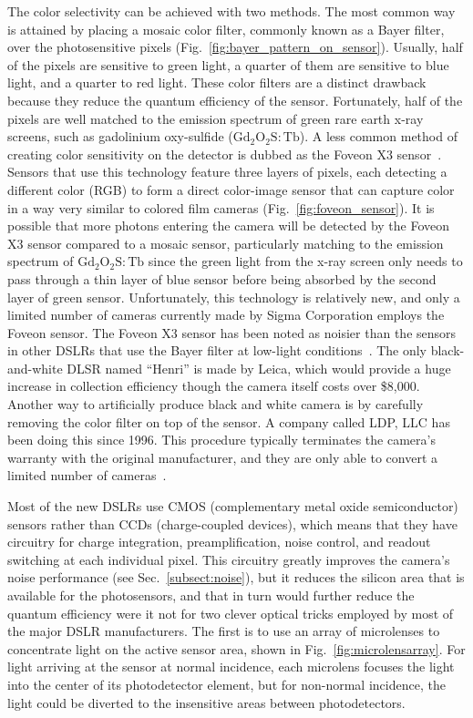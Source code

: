 The color selectivity can be achieved with two methods.  The most common way is attained by placing a mosaic color filter, commonly known as a Bayer filter, over the photosensitive pixels (Fig.~\ref{fig:bayer_pattern_on_sensor}).  Usually, half of the pixels are sensitive to green light, a quarter of them are sensitive to blue light, and a quarter to red light.  These color filters are a distinct drawback because they reduce the quantum efficiency of the sensor.  Fortunately, half of the pixels are well matched to the emission spectrum of green rare earth x-ray screens, such as gadolinium oxy-sulfide ($\mathrm{Gd_2O_2S:Tb}$).  A less common method of creating color sensitivity on the detector is dubbed as the Foveon X3 sensor~\citep{foveon}.  Sensors that use this technology feature three layers of pixels, each detecting a different color (RGB) to form a direct color-image sensor that can capture color in a way very similar to colored film cameras (Fig.~\ref{fig:foveon_sensor}).  It is possible that more photons entering the camera will be detected by the Foveon X3 sensor compared to a mosaic sensor, particularly matching to the emission spectrum of $\mathrm{Gd_2O_2S:Tb}$ since the green light from the x-ray screen only needs to pass through a thin layer of blue sensor before being absorbed by the second layer of green sensor.  Unfortunately, this technology is relatively new, and only a limited number of cameras currently made by Sigma Corporation employs the Foveon sensor.  The Foveon X3 sensor has been noted as noisier than the sensors in other DSLRs that use the Bayer filter at low-light conditions~\citep{sigmasd10, stevesdigicams}.  The only black-and-white DLSR named ``Henri'' is made by Leica, which would provide a huge increase in collection efficiency though the camera itself costs over \$8,000.  Another way to artificially produce black and white camera is by carefully removing the color filter on top of the sensor.  A company called LDP, LLC has been doing this since 1996.  This procedure typically terminates the camera's warranty with the original manufacturer, and they are only able to convert a limited number of cameras~\citep{maxmax}.

Most of the new DSLRs use CMOS (complementary metal oxide semiconductor) sensors rather than CCDs (charge-coupled devices), which means that they have circuitry for charge integration, preamplification, noise control, and readout switching at each individual pixel. This circuitry greatly improves the camera's noise performance (see Sec.~\ref{subsect:noise}), but it reduces the silicon area that is available for the photosensors, and that in turn would further reduce the quantum efficiency were it not for two clever optical tricks employed by most of the major DSLR manufacturers. The first is to use an array of microlenses to concentrate light on the active sensor area, shown in Fig.~\ref{fig:microlensarray}. For light arriving at the sensor at normal incidence, each microlens focuses the light into the center of its photodetector element, but for non-normal incidence, the light could be diverted to the insensitive areas between photodetectors.


